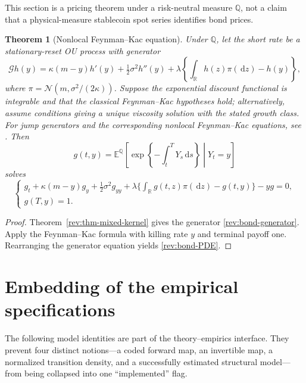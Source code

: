 \documentclass[11pt]{article}
\newtheorem{theorem}[definition]{Theorem}
\theoremstyle{remark}
\newcommand{\E}{\mathbb E}
\newcommand{\Qq}{\mathbb Q}
\newcommand{\R}{\mathbb R}
\newcommand{\dd}{\,\mathrm d}
\newcommand{\Normal}{\mathcal N}
\begin{document}
This section is a pricing theorem under a risk-neutral measure $\Qq$, not a
claim that a physical-measure stablecoin spot series identifies bond prices.

\begin{theorem}[Nonlocal Feynman--Kac equation]
\label{rev:thm-bond-PDE}
Under $\Qq$, let the short rate be a stationary-reset OU process with generator
\begin{equation}
\mathcal Gh(y)=\kappa(m-y)h'(y)+\tfrac12\sigma^2h''(y)
+\lambda\left\{\int_\R h(z)\pi(\dd z)-h(y)\right\},
\label{rev:bond-generator}
\end{equation}
where $\pi=\Normal(m,\sigma^2/(2\kappa))$.  Suppose the exponential discount
functional is integrable and that the classical Feynman--Kac hypotheses hold;
alternatively, assume conditions giving a unique viscosity solution with the
stated growth class.  For jump generators and the corresponding nonlocal
Feynman--Kac equations, see \citet[Chapters~8 and~12]{ContTankov2004}.  Then
\begin{equation}
g(t,y)=\E^{\Qq}\!\left[
\exp\!\left\{-\int_t^TY_s\dd s\right\}\middle|Y_t=y\right]
\label{rev:bond-value}
\end{equation}
solves
\begin{equation}
\begin{cases}
g_t+\kappa(m-y)g_y+\tfrac12\sigma^2g_{yy}
+\lambda\{\int_\R g(t,z)\pi(\dd z)-g(t,y)\}-yg=0,\\
g(T,y)=1.
\end{cases}
\label{rev:bond-PDE}
\end{equation}
\end{theorem}

\begin{proof}
Theorem~\ref{rev:thm-mixed-kernel} gives the generator
\eqref{rev:bond-generator}.  Apply the Feynman--Kac formula with killing rate
$y$ and terminal payoff one.  Rearranging the generator equation yields
\eqref{rev:bond-PDE}.
\end{proof}

\section{Embedding of the empirical specifications}

The following model identities are part of the theory--empirics interface.
They prevent four distinct notions---a coded forward map, an invertible map, a
normalized transition density, and a successfully estimated structural
model---from being collapsed into one ``implemented'' flag.
\end{document}
